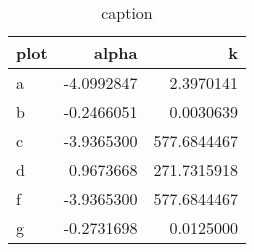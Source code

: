 \begin{table}
\centering
\begin{tabular}{lrr}
  \hline
plot & alpha & k \\ 
  \hline
a & -4.0992847 & 2.3970141 \\ 
  b & -0.2466051 & 0.0030639 \\ 
  c & -3.9365300 & 577.6844467 \\ 
  d & 0.9673668 & 271.7315918 \\ 
  f & -3.9365300 & 577.6844467 \\ 
  g & -0.2731698 & 0.0125000 \\ 
   \hline
\end{tabular}
\caption{caption} 
\label{tab:fitting_insideLambda_firstModel_phi0_nm400_dynamic_oneToOne_allowUnlinked}
\end{table}
